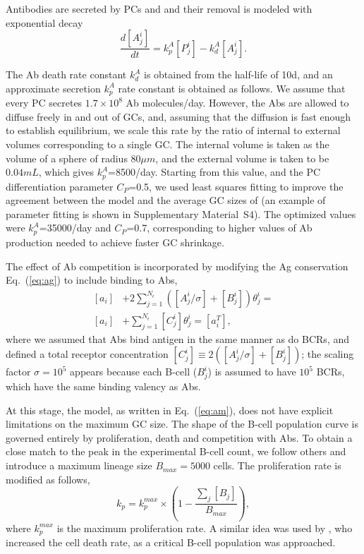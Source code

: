 \documentclass[utf8]{frontiersHLTH}%
\newcommand{\td}[2]{\frac{d {#1}}{d {#2}}}
\newcommand{\eq}[1] {Eq.~(\ref{eq:#1})}
\newcommand{\SI}{Supplementary Material}
\begin{document}
Antibodies are secreted by PCs and and their removal is modeled with exponential decay
\begin{equation}
 \td{[A^i_j]}{t} = k_p^A[P^i_j] - k^A_d [A^i_j].
 \label{eq:abs}
\end{equation}

The Ab death rate constant $k^A_d$ is obtained from the half-life of 10d,\cite{zhang13} and an approximate
secretion $k_p^A$ rate constant is obtained as follows. We assume that every PC
secretes $1.7\times10^8$ Ab molecules/day\cite{leanderson92}. However,
the Abs are allowed to diffuse freely in and out of GCs, and, assuming
that the diffusion is fast enough to establish equilibrium, we scale this rate by the ratio of
internal to external volumes corresponding to a single GC. The internal
volume is taken as the volume of a sphere of radius 80$\mu
m$,\cite{wittenbrink11}
and the external
volume is taken to be $0.04mL$\cite{zhang13}, which gives
$k_p^A$=8500/day. Starting from this value, and the PC
differentiation parameter $C_P$=0.5, we used least squares fitting to
improve the agreement between the model and the average GC sizes of
\citet{wittenbrink11} (an example of parameter fitting is shown in \SI~S4). The optimized values were
$k_p^A$=35000/day and $C_P$=0.7, corresponding to higher values of Ab
production needed to achieve faster GC shrinkage.

The effect of Ab competition is incorporated by modifying the Ag conservation \eq{ag} to include binding to Abs,
\begin{equation}
 \begin{aligned}
 [a_i] &+ 2\sum^{N_\epsilon}_{j=1} ([A^i_j/\sigma]+[B^i_j])\theta^i_j=\\
 [a_i] &+\sum^{N_\epsilon}_{j=1} [C^i_j]\theta^i_j=[a^T_i],
 \end{aligned}
 \label{eq:ag2}
\end{equation}
where we assumed that Abs bind antigen in the same manner as do BCRs, and defined a total receptor concentration
$[C_j^i]\equiv 2([A^i_j/\sigma]+[B^i_j])$;
the scaling factor $\sigma=10^5$ appears because each B-cell ($B^i_j$) is assumed to have $10^5$ BCRs,\cite{casten88}
which have the same binding valency as Abs.

At this stage, the model, as written in \eq{am}, does not have explicit
limitations on the maximum GC size. The shape of the B-cell population
curve is governed entirely by proliferation, death and competition with
Abs. To obtain a close match to the peak in the experimental B-cell
count,\cite{wittenbrink11} we follow others
\cite{oprea97,rundell98} and introduce a maximum lineage size $B_{max}=5000$ cells.
The proliferation rate is modified as follows,
\begin{equation}
 k_p=k_p^{max}\times\left(1-\frac{\sum_j [B_j]}{B_{max}}\right),
 \label{eq:kprof}
\end{equation}
where $k_p^{max}$ is the maximum proliferation rate. A similar idea was
used by \citet{amitai20}, who increased the cell death rate, as a
critical B-cell population was approached.
\end{document}
